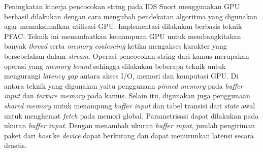\documentclass[conference]{IEEEtran}
\begin{document}
    Peningkatan kinerja pencocokan string pada IDS Snort menggunakan GPU berhasil dilakukan dengan cara mengubah pendekatan algoritma yang digunakan agar memaksimalkan utilisasi GPU. Implementasi dilakukan berbasis teknik PFAC. Teknik ini memanfaatkan kemampuan GPU untuk membangkitakan banyak \emph{thread} serta \emph{memory coalescing} ketika mengakses karakter yang bersebelahan dalam \emph{stream}.    
    Operasi pencocokan string dari kamus merupakan operasi yang \emph{memory bound} sehingga dilakukan beberapa teknik untuk mengurangi \emph{latency gap} antara akses I/O, memori dan komputasi GPU. Di antara teknik yang digunakan yaitu penggunaan \emph{pinned memory} pada \emph{buffer input} dan \emph{texture memory} pada kamus. Selain itu, digunakan juga penggunaan \emph{shared memory} untuk menampung \emph{buffer input} dan tabel transisi dari \emph{state} awal untuk menghemat \emph{fetch} pada memori global.
    Parametrisasi dapat dilakukan pada ukuran \emph{buffer input}. Dengan menambah ukuran \emph{buffer input}, jumlah pengiriman paket dari \emph{host} ke \emph{device} dapat berkurang dan dapat menurunkan latensi secara drastis.




\end{document}
